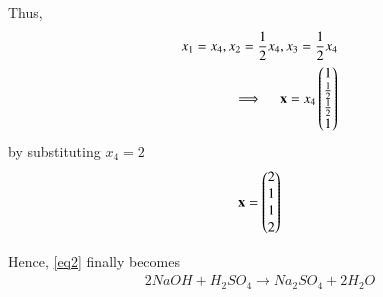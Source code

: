 \documentclass[journal,12pt,twocolumn]{IEEEtran}
\begin{document}
Thus,
\begin{align}
    x_1=x_4, x_2= \frac{1}{2}x_4, x_3=\frac{1}{2}x_4\\
    \implies \quad\mathbf{x}= x_4\begin{pmatrix}1\\ \frac{1}{2}\\ \frac{1}{2}\\1\end{pmatrix} 
\end{align} 
by substituting $x_4= 2$
\begin{align}
    \mathbf{x}=\begin{pmatrix}2\\1\\1\\2\end{pmatrix}
\end{align}

Hence, \eqref{eq2} finally becomes
\hfill\break
\begin{align}
    2 NaOH + H_2SO_4 \xrightarrow{} 
    Na_2SO_4 + 2 H_2O
\end{align}
\end{document}
